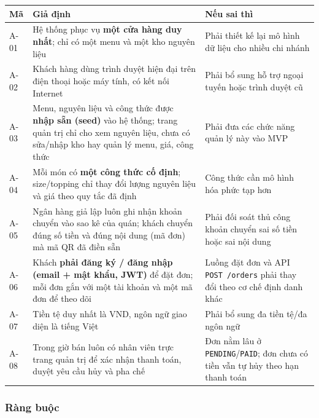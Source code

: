 {\small\renewcommand{\arraystretch}{1.25}
\begin{tabularx}{\linewidth}{@{}l X X@{}}
\toprule
\textbf{Mã} & \textbf{Giả định} & \textbf{Nếu sai thì} \\
\midrule
A-01 & Hệ thống phục vụ \textbf{một cửa hàng duy nhất}; chỉ có một menu và một kho nguyên liệu & Phải thiết kế lại mô hình dữ liệu cho nhiều chi nhánh \\
A-02 & Khách hàng dùng trình duyệt hiện đại trên điện thoại hoặc máy tính, có kết nối Internet & Phải bổ sung hỗ trợ ngoại tuyến hoặc trình duyệt cũ \\
A-03 & Menu, nguyên liệu và công thức được \textbf{nhập sẵn (seed)} vào hệ thống; trang quản trị chỉ cho xem nguyên liệu, chưa có sửa/nhập kho hay quản lý menu, giá, công thức & Phải đưa các chức năng quản lý này vào MVP \\
A-04 & Mỗi món có \textbf{một công thức cố định}; size/topping chỉ thay đổi lượng nguyên liệu và giá theo quy tắc đã định & Công thức cần mô hình hóa phức tạp hơn \\
A-05 & Ngân hàng giả lập luôn ghi nhận khoản chuyển vào sao kê của quán; khách chuyển đúng số tiền và đúng nội dung (mã đơn) mà mã QR đã điền sẵn & Phải đối soát thủ công khoản chuyển sai số tiền hoặc sai nội dung \\
A-06 & Khách \textbf{phải đăng ký / đăng nhập (email + mật khẩu, JWT)} để đặt đơn; mỗi đơn gắn với một tài khoản và một mã đơn để theo dõi & Luồng đặt đơn và API \texttt{POST /orders} phải thay đổi theo cơ chế định danh khác \\
A-07 & Tiền tệ duy nhất là VND, ngôn ngữ giao diện là tiếng Việt & Phải bổ sung đa tiền tệ/đa ngôn ngữ \\
A-08 & Trong giờ bán luôn có nhân viên trực trang quản trị để xác nhận thanh toán, duyệt yêu cầu hủy và pha chế & Đơn nằm lâu ở \texttt{PENDING}/\texttt{PAID}; đơn chưa có tiền vẫn tự hủy theo hạn thanh toán \\
\bottomrule
\end{tabularx}}

\subsubsection{Ràng buộc}

